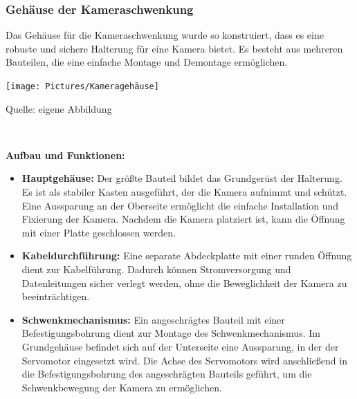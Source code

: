 \documentclass[ngerman,12pt,a4paper]{article}
\begin{document}
				\subsubsection{Gehäuse der Kameraschwenkung} %
				Das Gehäuse für die Kameraschwenkung wurde so konstruiert, dass es eine robuste und sichere Halterung für eine Kamera bietet. Es besteht aus mehreren Bauteilen, die eine einfache Montage und Demontage ermöglichen.
				
				\begin{center}
					\begin{minipage}[t]{0.7\textwidth}
						\texttt{[image: Pictures/Kameragehäuse]}
						\label{fig:camturn}
						\vspace{-10pt}
						\begin{center}
							\par\small Quelle: eigene Abbildung 
						\end{center}
					\end{minipage} \\[0.20cm]
				\end{center}
				\textbf{Aufbau und Funktionen:}
				\begin{itemize}
					\item \textbf{Hauptgehäuse:} Der größte Bauteil bildet das Grundgerüst der Halterung. Es ist als stabiler Kasten ausgeführt, der die Kamera aufnimmt und schützt. Eine Aussparung an der Oberseite ermöglicht die einfache Installation und Fixierung der Kamera. Nachdem die Kamera platziert ist, kann die Öffnung mit einer Platte geschlossen werden.
					\item \textbf{Kabeldurchführung:} Eine separate Abdeckplatte mit einer runden Öffnung dient zur Kabelführung. Dadurch können Stromversorgung und Datenleitungen sicher verlegt werden, ohne die Beweglichkeit der Kamera zu beeinträchtigen.
					\item \textbf{Schwenkmechanismus:} Ein angeschrägtes Bauteil mit einer Befestigungsbohrung dient zur Montage des Schwenkmechanismus. Im Grundgehäuse befindet sich auf der Unterseite eine Aussparung, in der der Servomotor eingesetzt wird. Die Achse des Servomotors wird anschließend in die Befestigungsbohrung des angeschrägten Bauteils geführt, um die Schwenkbewegung der Kamera zu ermöglichen.
				\end{itemize}
				
\end{document}
